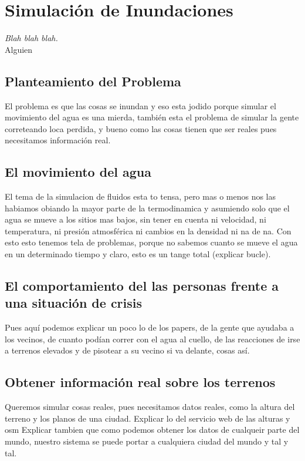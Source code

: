 
\chapter*{Simulación de Inundaciones} \label{cap2}


\begin{flushright}
\begin{minipage}{7.85cm}
    {\em Blah blah blah.} \\  Alguien
\end{minipage}
\end{flushright}

\vspace*{5mm}

\section*{Planteamiento del Problema}
El problema es que las cosas se inundan y eso esta jodido porque simular el movimiento del agua
es una mierda, también esta el problema de simular la gente correteando loca perdida, y bueno
como las cosas tienen que ser reales pues necesitamos información real.

\section*{El movimiento del agua}
El tema de la simulacion de fluidos esta to tensa, pero mas o menos nos las habiamos obiando la 
mayor parte de la termodinamica y asumiendo solo que el agua se mueve a los sitios mas bajos, sin
tener en cuenta ni velocidad, ni temperatura, ni presión atmosférica ni cambios en la densidad
ni na de na. Con esto esto tenemos tela de problemas, porque no sabemos cuanto se mueve el agua
en un determinado tiempo y claro, esto es un tange total (explicar bucle).

\section*{El comportamiento del las personas frente a una situación de crisis}
Pues aquí podemos explicar un poco lo de los papers, de la gente que ayudaba a los vecinos, de
cuanto podían correr con el agua al cuello, de las reacciones de irse a terrenos elevados y de 
pisotear a su vecino si va delante, cosas así.

\section*{Obtener información real sobre los terrenos}
Queremos simular cosas reales, pues necesitamos datos reales, como la altura del terreno y
los planos de una ciudad. Explicar lo del servicio web de las alturas y osm
Explicar tambien que como podemos obtener los datos de cualqueir parte del mundo, nuestro sistema
se puede portar a cualquiera ciudad del mundo y tal y tal.